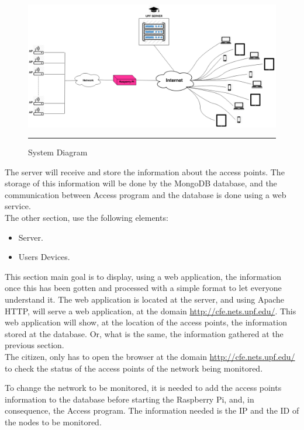 \documentclass[12pt, a4paper,twoside]{tesi_upf}
\begin{document}
        \begin{figure}[htbp]
          \centering
              \includegraphics[scale=0.42,angle=90]{./figures/arq.png}
              \rule{32em}{0.5pt}
            \caption[System Diagram]{System Diagram}
            \label{fig:arq}
        \end{figure}
        
        The server will receive and store the information about the access points. The storage of this information will be done by the MongoDB database, and the communication between Access program and the database is done using a web service.\\
        
        The other section, use the following elements:
          \begin{itemize}
            \item Server.
            \item Users Devices.
        \end{itemize}
        
        This section main goal is to display, using a web application, the information once this has been gotten and processed with a simple format to let everyone understand it. The web application is located at the server, and using Apache HTTP, will serve a web application, at the domain \url{http://cfe.nets.upf.edu/}. This web application will show, at the location of the access points, the information stored at the database. Or, what is the same, the information gathered at the previous section.\\
        
        The citizen, only has to open the browser at the domain \url{http://cfe.nets.upf.edu/} to check the status of the access points of the network being monitored.
        
        To change the network to be monitored, it is needed to add the  access points information to the database before starting the Raspberry Pi, and, in consequence, the Access program. The information needed is the IP and the ID of the nodes to be monitored.
        
\end{document}
